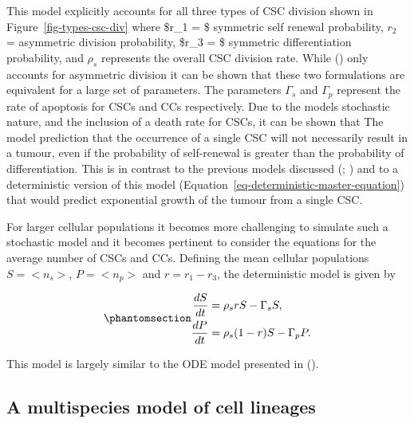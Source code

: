 \documentclass[
  letterpaper,
]{scrreprt}
\theoremstyle{definition}
\theoremstyle{remark}
\begin{document}
This model explicitly accounts for all three types of CSC division shown
in Figure~\ref{fig-types-csc-div} where \$r\_1 = \$ symmetric self
renewal probability, \(r_2\) = asymmetric division probability, \$r\_3 =
\$ symmetric differentiation probability, and \(\rho_s\) represents the
overall CSC division rate. While () only accounts for asymmetric division it
can be shown that these two formulations are equivalent for a large set
of parameters. The parameters \(\Gamma_s\) and \(\Gamma_p\) represent
the rate of apoptosis for CSCs and CCs respectively. Due to the models
stochastic nature, and the inclusion of a death rate for CSCs, it can be
shown that The model prediction that the occurrence of a single CSC will
not necessarily result in a tumour, even if the probability of
self-renewal is greater than the probability of differentiation. This is
in contrast to the previous models discussed
(;
) and to
a deterministic version of this model
(Equation~\ref{eq-deterministic-master-equation}) that would predict
exponential growth of the tumour from a single CSC.

For larger cellular populations it becomes more challenging to simulate
such a stochastic model and it becomes pertinent to consider the
equations for the average number of CSCs and CCs. Defining the mean
cellular populations \(S = <n_s>\), \(P = <n_p>\) and \(r = r_1 - r_3\),
the deterministic model is given by

\begin{equation}\phantomsection\label{eq-deterministic-master-equation}{
\begin{aligned}
\frac{dS}{dt} &= \rho_s r S - \Gamma_s S, \\
\frac{dP}{dt} &= \rho_s (1-r) S - \Gamma_p P.
\end{aligned}
}\end{equation}

This model is largely similar to the ODE model presented in
().

\subsection{A multispecies model of cell
lineages}\label{sec-multispecies-model-of-cell-lineages}
\end{document}
